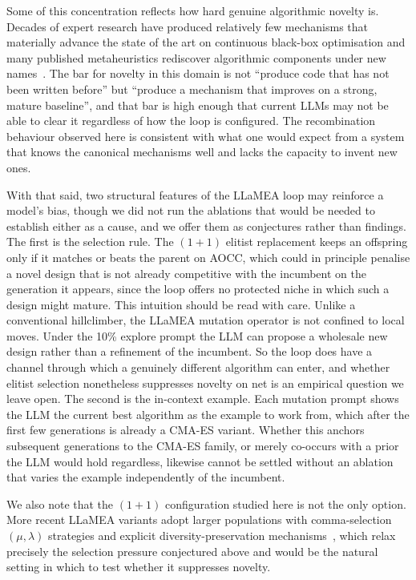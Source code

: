 Some of this concentration reflects how hard genuine algorithmic novelty is. Decades of expert research have produced relatively few mechanisms that materially advance the state of the art on continuous black-box optimisation and many published metaheuristics rediscover algorithmic components under new names~\cite{aranha2022metaphor}. The bar for novelty in this domain is not ``produce code that has not been written before'' but ``produce a mechanism that improves on a strong, mature baseline'', and that bar is high enough that current LLMs may not be able to clear it regardless of how the loop is configured. The recombination behaviour observed here is consistent with what one would expect from a system that knows the canonical mechanisms well and lacks the capacity to invent new ones.

With that said, two structural features of the LLaMEA loop may reinforce a model's bias, though we did not run the ablations that would be needed to establish either as a cause, and we offer them as conjectures rather than findings. The first is the selection rule. The $(1{+}1)$ elitist replacement keeps an offspring only if it matches or beats the parent on AOCC, which could in principle penalise a novel design that is not already competitive with the incumbent on the generation it appears, since the loop offers no protected niche in which such a design might mature. This intuition should be read with care. Unlike a conventional hillclimber, the LLaMEA mutation operator is not confined to local moves. Under the 10\% explore prompt the LLM can propose a wholesale new design rather than a refinement of the incumbent. So the loop does have a channel through which a genuinely different algorithm can enter, and whether elitist selection nonetheless suppresses novelty on net is an empirical question we leave open. The second is the in-context example. Each mutation prompt shows the LLM the current best algorithm as the example to work from, which after the first few generations is already a CMA-ES variant. Whether this anchors subsequent generations to the CMA-ES family, or merely co-occurs with a prior the LLM would hold regardless, likewise cannot be settled without an ablation that varies the example independently of the incumbent.

We also note that the $(1{+}1)$ configuration studied here is not the only option. More recent LLaMEA variants adopt larger populations with comma-selection $(\mu, \lambda)$ strategies and explicit diversity-preservation mechanisms~\cite{vanStein2025Behaviour}, which relax precisely the selection pressure conjectured above and would be the natural setting in which to test whether it suppresses novelty.

